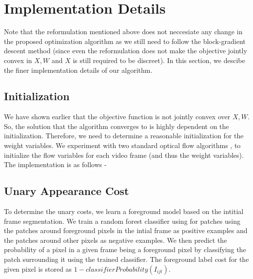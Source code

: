 \section{Implementation Details}

Note that the reformulation mentioned above does not neccesiate any
change in the proposed optimization algorithm as we still need to
follow the block-gradient descent method (since even the reformulation
does not make the objective jointly convex in $X,W$ and $X$ is still
required to be discreet). In this section, we descibe the finer implementation
details of our algorithm.


\subsection{Initialization}

We have shown earlier that the objective function is not jointly convex
over $X,W$. So, the solution that the algorithm converges to is highly
dependent on the initialization. Therefore, we need to determine a
reasonable initialization for the weight variables. We experiment
with two standard optical flow algorithms \cite{HornSchunk}, \cite{LukasKanade} to
initialize the flow variables for each video frame (and thus the weight
variables). The implementation is as follows -

\begin{algorithm}[H]
\caption{$generatePriors(I)$}
\end{algorithm}



\subsection{Unary Appearance Cost}

To determine the unary costs, we learn a foreground model based on
the intitial frame segmentation. We train a random forest classifier
using for patches using the patches around foreground pixels in the
intial frame as positive examples and the patches around other pixels
as negative examples. We then predict the probability of a pixel in
a given frame being a foreground pixel by classifying the patch surrounding
it using the trained classifier. The foreground label cost for the
given pixel is stored as $1-classifierProbability(I_{ijt})$.

